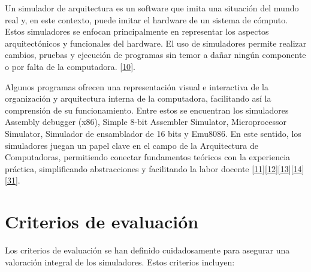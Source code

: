 \documentclass[12pt,twoside]{templates/unerthesis}
\begin{document}
Un simulador de arquitectura es un software que imita una situación del mundo real y, en este contexto, puede imitar el hardware de un sistema de cómputo. Estos simuladores se enfocan principalmente en representar los aspectos arquitectónicos y funcionales del hardware. El uso de simuladores permite realizar cambios, pruebas y ejecución de programas sin temor a dañar ningún componente o por falta de la computadora. {[}\protect\hyperlink{ref-radivojevic_design_2011}{10}{]}.

Algunos programas ofrecen una representación visual e interactiva de la organización y arquitectura interna de la computadora, facilitando así la comprensión de su funcionamiento. Entre estos se encuentran los simuladores Assembly debugger (x86), Simple 8-bit Assembler Simulator, Microprocessor Simulator, Simulador de ensamblador de 16 bits y Emu8086. En este sentido, los simuladores juegan un papel clave en el campo de la Arquitectura de Computadoras, permitiendo conectar fundamentos teóricos con la experiencia práctica, simplificando abstracciones y facilitando la labor docente {[}\protect\hyperlink{ref-nikolic_survey_2009}{11}{]}{[}\protect\hyperlink{ref-hasan_survey_2012}{12}{]}{[}\protect\hyperlink{ref-hennessy_computer_2012}{13}{]}{[}\protect\hyperlink{ref-stallings_computer_2013}{14}{]}{[}\protect\hyperlink{ref-behrooz_computer_2005}{31}{]}.

\hypertarget{criterios-de-evaluaciuxf3n}{%
\section{Criterios de evaluación}\label{criterios-de-evaluaciuxf3n}}

Los criterios de evaluación se han definido cuidadosamente para asegurar una valoración integral de los simuladores. Estos criterios incluyen:
\end{document}
